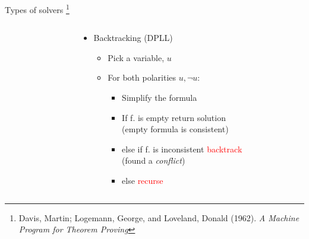 \documentclass[mathserif,serif]{beamer}
\begin{document}
\begin{frame}{Types of solvers}
\let\thefootnote\relax\footnote{
Davis, Martin; Logemann, George, and Loveland, Donald (1962). \emph{A Machine Program for Theorem Proving}}

  \begin{columns}[T]
    \begin{column}[T]{0.4\textwidth}
      \centering
    \end{column}

    \begin{column}[T]{0.7\textwidth}
      \begin{itemize}
        \item Backtracking (DPLL)
         {
          \begin{itemize}
            \item Pick a variable, $u$
            \item For both polarities $u, \neg u$:
            \begin{itemize}
              \item Simplify the formula
              \item If f. is empty return solution \\
              (empty formula is consistent)
              \item else if f. is inconsistent \textcolor{red}{backtrack} \\
              (found a \emph{conflict}) 
              \item else \textcolor{red}{recurse}
            \end{itemize}
          \end{itemize}
        }


\end{itemize}
\end{column}
\end{columns}
\end{frame}
\end{document}
